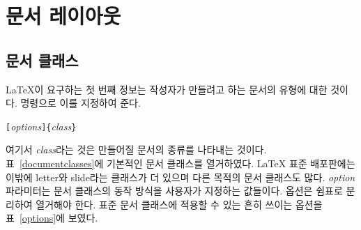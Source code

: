 \section{문서 레이아웃}

\subsection{문서 클래스}\label{sec:documentclass}

\LaTeX 이 요구하는 첫 번째 정보는 작성자가 만들려고 하는 문서의 유형에 대한 것이다.  명령으로 이를 지정하여 준다.
\begin{lscommand}
\verb|[|\emph{options}\verb|]{|\emph{class}\verb|}|
\end{lscommand}
\noindent 여기서 \emph{class}라는 것은 만들어질 문서의 종류를 나타내는 것이다. 
표~\ref{documentclasses}에 기본적인 문서 클래스를 열거하였다. \LaTeX{} 표준 배포판에는 이밖에 letter와 slide라는 
클래스가 더 있으며 다른 목적의 문서 클래스도 많다.
\emph{option} 파라미터는 문서 클래스의 동작 방식을 사용자가 지정하는 값들이다.
옵션은 쉼표로 분리하여 열거해야 한다. 표준 문서 클래스에 적용할 수 있는 흔히 쓰이는 옵션을 표~\ref{options}에 보였다.


